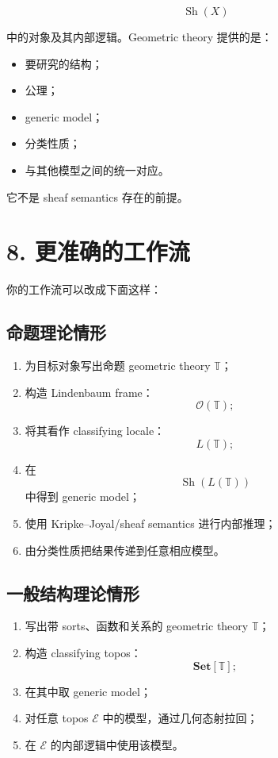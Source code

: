 \documentclass{ctexart}
\begin{document}
\[
\operatorname{Sh}(X)
\]

中的对象及其内部逻辑。Geometric theory 提供的是：

\begin{itemize}
\item 要研究的结构；
\item 公理；
\item generic model；
\item 分类性质；
\item 与其他模型之间的统一对应。
\end{itemize}

它不是 sheaf semantics 存在的前提。

\section*{8. 更准确的工作流}

你的工作流可以改成下面这样：

\subsection*{命题理论情形}

\begin{enumerate}
\item 为目标对象写出命题 geometric theory \(\mathbb T\)；
\item 构造 Lindenbaum frame：
   \[
   \mathcal O(\mathbb T);
   \]
\item 将其看作 classifying locale：
   \[
   L(\mathbb T);
   \]
\item 在
   \[
   \operatorname{Sh}(L(\mathbb T))
   \]
   中得到 generic model；
\item 使用 Kripke–Joyal/sheaf semantics 进行内部推理；
\item 由分类性质把结果传递到任意相应模型。
\end{enumerate}

\subsection*{一般结构理论情形}

\begin{enumerate}
\item 写出带 sorts、函数和关系的 geometric theory \(\mathbb T\)；
\item 构造 classifying topos：
   \[
   \mathbf{Set}[\mathbb T];
   \]
\item 在其中取 generic model；
\item 对任意 topos \(\mathcal E\) 中的模型，通过几何态射拉回；
\item 在 \(\mathcal E\) 的内部逻辑中使用该模型。
\end{enumerate}
\end{document}
